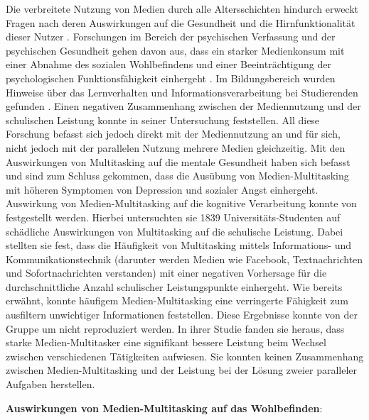 Die verbreitete Nutzung von Medien durch alle Altersschichten hindurch erweckt Fragen nach deren Auswirkungen auf die Gesundheit und die Hirnfunktionalität dieser Nutzer . Forschungen im Bereich der psychischen Verfassung und der psychischen Gesundheit gehen davon aus, dass ein starker Medienkonsum mit einer Abnahme des sozialen Wohlbefindens und einer Beeinträchtigung der psychologischen Funktionsfähigkeit einhergeht \cite{Kraut1998, Moody2001}. Im Bildungsbereich wurden Hinweise über das Lernverhalten und Informationsverarbeitung bei Studierenden gefunden \cite{Prensky2001}. Einen negativen Zusammenhang zwischen der Mediennutzung und der schulischen Leistung konnte  in seiner Untersuchung feststellen. All diese Forschung befasst sich jedoch direkt mit der Mediennutzung an und für sich, nicht jedoch mit der parallelen Nutzung mehrere Medien gleichzeitig. Mit den Auswirkungen von Multitasking auf die mentale Gesundheit haben sich  befasst und sind zum Schluss gekommen, dass die Ausübung von Medien-Multitasking mit höheren Symptomen von Depression und sozialer Angst einhergeht. Auswirkung von Medien-Multitasking auf die kognitive Verarbeitung konnte von  festgestellt werden. Hierbei untersuchten sie 1839 Universitäts-Studenten auf schädliche Auswirkungen von Multitasking auf die schulische Leistung. Dabei stellten sie fest, dass die Häufigkeit von Multitasking mittels Informations- und Kommunikationstechnik (darunter werden Medien wie Facebook, Textnachrichten und Sofortnachrichten verstanden) mit einer negativen Vorhersage für die durchschnittliche Anzahl schulischer Leistungspunkte einhergeht. Wie bereits erwähnt, konnte  häufigem Medien-Multitasking eine verringerte Fähigkeit zum ausfiltern unwichtiger Informationen feststellen. Diese Ergebnisse konnte von der Gruppe um  nicht reproduziert werden. In ihrer Studie fanden sie heraus, dass starke Medien-Multitasker eine signifikant bessere Leistung beim Wechsel zwischen verschiedenen Tätigkeiten aufwiesen. Sie konnten keinen Zusammenhang zwischen Medien-Multitasking und der Leistung bei der Lösung zweier paralleler Aufgaben herstellen. 
\par
\textbf{Auswirkungen von Medien-Multitasking auf das Wohlbefinden}: 

